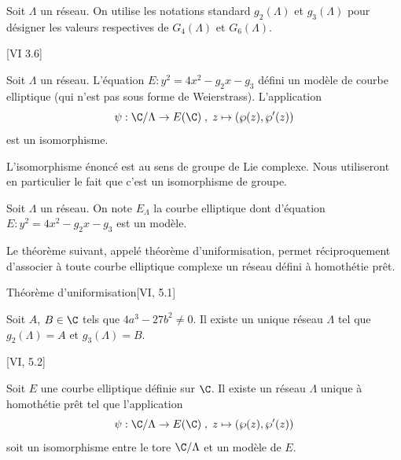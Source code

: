 \begin{Def}
	Soit $\Lambda$ un réseau. On utilise les notations standard $g_{2}(\Lambda)$ et $g_{3}(\Lambda)$ pour désigner les valeurs respectives de $G_{4}(\Lambda)$ et $G_{6}(\Lambda)$.
\end{Def}

\begin{Prop}\cite{Sil09}[VI 3.6]
	
	Soit $\Lambda$ un réseau. L'équation $E : y^2 = 4x^2 - g_{2}x - g_{3}$ défini un modèle de courbe elliptique (qui n'est pas sous forme de Weierstrass). L'application
	\begin{equation*}
		\psi : \C/\Lambda \rightarrow E(\C)\; ,\; z\mapsto \left(\wp(z), \wp'(z)\right)
	\end{equation*}
	est un isomorphisme. 
\end{Prop}

\begin{Rem}
	L'isomorphisme énoncé est au sens de groupe de Lie complexe. Nous utiliseront en particulier le fait que c'est un isomorphisme de groupe. 
\end{Rem}

\begin{Def}
	Soit $\Lambda$ un réseau. On note $E_{\Lambda}$ la courbe elliptique dont d'équation $E : y^{2} = 4x^{2} - g_2 x - g_3$ est un modèle. 
\end{Def}

Le théorème suivant, appelé théorème d'uniformisation, permet réciproquement d'associer à toute courbe elliptique complexe un réseau défini à homothétie prêt.

\begin{The}{Théorème d'uniformisation}\cite{Sil09}[VI, 5.1]
	
	Soit $A$, $B\in\C$ tels que $4a^3 - 27b^2\neq0$. Il existe un unique réseau $\Lambda$ tel que $g_{2}(\Lambda) = A$ et $g_{3}(\Lambda) = B$. 
\end{The}

\begin{Coro}\cite{Sil09}[VI, 5.2]
	
	Soit $E$ une courbe elliptique définie sur $\C$. Il existe un réseau $\Lambda$ unique à homothétie prêt tel que l'application
	\begin{equation*}
		\psi : \C/\Lambda \rightarrow E(\C)\; ,\; z\mapsto \left(\wp(z), \wp'(z)\right)
	\end{equation*}
	soit un isomorphisme entre le tore $\C/\Lambda$ et un modèle de $E$.
\end{Coro}






